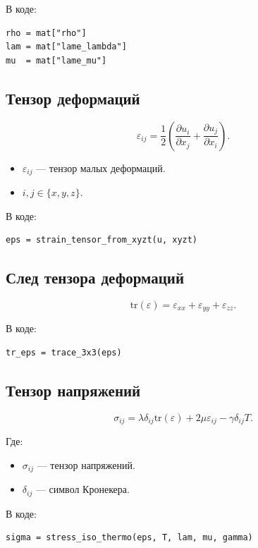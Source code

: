\documentclass[12pt]{article}
\begin{document}
В коде:
\begin{verbatim}
rho = mat["rho"]
lam = mat["lame_lambda"]
mu  = mat["lame_mu"]
\end{verbatim}

\subsection{Тензор деформаций}

\[
\varepsilon_{ij}
=
\frac{1}{2}
\left(
\frac{\partial u_i}{\partial x_j}
+
\frac{\partial u_j}{\partial x_i}
\right).
\]

\begin{itemize}
\item $\varepsilon_{ij}$ --- тензор малых деформаций.
\item $i,j \in \{x,y,z\}$.
\end{itemize}

В коде:
\begin{verbatim}
eps = strain_tensor_from_xyzt(u, xyzt)
\end{verbatim}

\subsection{След тензора деформаций}

\[
\mathrm{tr}(\varepsilon)
=
\varepsilon_{xx}
+
\varepsilon_{yy}
+
\varepsilon_{zz}.
\]

В коде:
\begin{verbatim}
tr_eps = trace_3x3(eps)
\end{verbatim}

\subsection{Тензор напряжений}

\[
\sigma_{ij}
=
\lambda \delta_{ij} \mathrm{tr}(\varepsilon)
+
2\mu \varepsilon_{ij}
-
\gamma \delta_{ij} T.
\]

Где:

\begin{itemize}
\item $\sigma_{ij}$ --- тензор напряжений.
\item $\delta_{ij}$ --- символ Кронекера.
\end{itemize}

В коде:
\begin{verbatim}
sigma = stress_iso_thermo(eps, T, lam, mu, gamma)
\end{verbatim}
\end{document}
